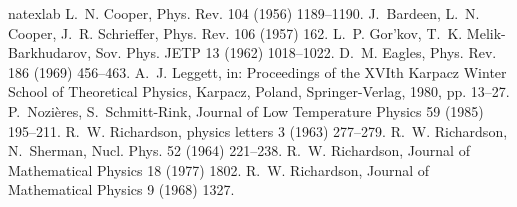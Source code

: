 \documentclass[5p,twocolumn]{elsarticle}
\begin{document}
\begin{thebibliography}{18}
\expandafter\ifx\csname natexlab\endcsname\relax\def\natexlab#1{#1}\fi
\providecommand{\bibinfo}[2]{#2}
\ifx\xfnm\relax \def\xfnm[#1]{\unskip,\space#1}\fi
\bibinfo{author}{L.~N. Cooper}, \bibinfo{journal}{Phys. Rev.}
  \bibinfo{volume}{104} (\bibinfo{year}{1956}) \bibinfo{pages}{1189--1190}.
\bibinfo{author}{J.~Bardeen}, \bibinfo{author}{L.~N. Cooper},
  \bibinfo{author}{J.~R. Schrieffer}, \bibinfo{journal}{Phys. Rev.}
  \bibinfo{volume}{106} (\bibinfo{year}{1957}) \bibinfo{pages}{162}.
\bibinfo{author}{L.~P. {Gor'kov}}, \bibinfo{author}{T.~K. Melik-Barkhudarov},
  \bibinfo{journal}{Sov. Phys. JETP} \bibinfo{volume}{13}
  (\bibinfo{year}{1962}) \bibinfo{pages}{1018--1022}.
\bibinfo{author}{D.~M. Eagles}, \bibinfo{journal}{Phys. Rev.}
  \bibinfo{volume}{186} (\bibinfo{year}{1969}) \bibinfo{pages}{456--463}.
\bibinfo{author}{A.~J. Leggett}, in: \bibinfo{booktitle}{Proceedings of the
  XVIth Karpacz Winter School of Theoretical Physics, Karpacz, Poland},
  \bibinfo{publisher}{Springer-Verlag}, \bibinfo{year}{1980}, pp.
  \bibinfo{pages}{13--27}.
\bibinfo{author}{P.~Nozi\`{e}res}, \bibinfo{author}{S.~Schmitt-Rink},
  \bibinfo{journal}{Journal of Low Temperature Physics} \bibinfo{volume}{59}
  (\bibinfo{year}{1985}) \bibinfo{pages}{195--211}.
\bibinfo{author}{R.~W. Richardson}, \bibinfo{journal}{physics letters}
  \bibinfo{volume}{3} (\bibinfo{year}{1963}) \bibinfo{pages}{277--279}.
\bibinfo{author}{R.~W. Richardson}, \bibinfo{author}{N.~Sherman},
  \bibinfo{journal}{Nucl. Phys.} \bibinfo{volume}{52} (\bibinfo{year}{1964})
  \bibinfo{pages}{221--238}.
\bibinfo{author}{R.~W. Richardson}, \bibinfo{journal}{Journal of Mathematical
  Physics} \bibinfo{volume}{18} (\bibinfo{year}{1977}) \bibinfo{pages}{1802}.
\bibinfo{author}{R.~W. Richardson}, \bibinfo{journal}{Journal of Mathematical
  Physics} \bibinfo{volume}{9} (\bibinfo{year}{1968}) \bibinfo{pages}{1327}.

\end{thebibliography}
\end{document}
